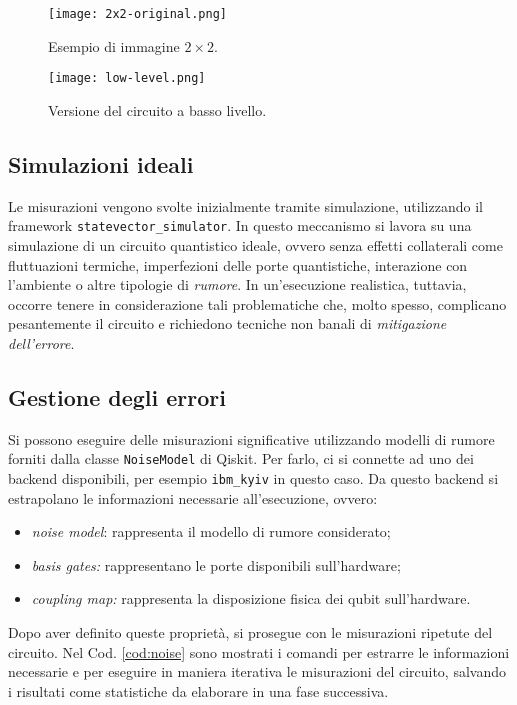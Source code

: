 \begin{figure}[ht]
	\centering
	\texttt{[image: 2x2-original.png]}
	\caption{Esempio di immagine $2\times2$.}\label{fig:2x2-original}
\end{figure}

\begin{figure}[ht]
    \texttt{[image: low-level.png]}
    \caption{Versione del circuito a basso livello.}
		\label{fig:circuito-2x2}
\end{figure}

\subsection{Simulazioni ideali}
Le misurazioni vengono svolte inizialmente tramite simulazione, utilizzando 
il framework \texttt{statevector\_simulator}. In questo meccanismo si lavora su 
una simulazione di un circuito quantistico ideale, ovvero senza effetti collaterali come
fluttuazioni termiche, imperfezioni delle porte quantistiche, interazione con l'ambiente 
o altre tipologie di \textit{rumore}.
In un'esecuzione realistica, tuttavia, occorre tenere in considerazione
tali problematiche che, molto spesso, complicano pesantemente
il circuito e richiedono tecniche non banali di \textit{mitigazione dell'errore}.

\subsection{Gestione degli errori}
Si possono eseguire delle misurazioni significative utilizzando modelli 
di rumore forniti dalla classe \texttt{NoiseModel} di Qiskit. 
Per farlo, ci si connette ad uno dei backend disponibili, per esempio 
\texttt{ibm\_kyiv} in questo caso. Da questo backend si estrapolano le 
informazioni necessarie all'esecuzione, ovvero:
\begin{itemize}
	\item \emph{noise model}: rappresenta il modello di rumore considerato;
    \item \emph{basis gates:} rappresentano le porte disponibili sull'hardware;
    \item \emph{coupling map:} rappresenta la disposizione fisica dei qubit sull'hardware.
\end{itemize}
Dopo aver definito queste proprietà, si prosegue con le misurazioni 
ripetute del circuito. Nel Cod. \ref{cod:noise} sono mostrati 
i comandi per estrarre le informazioni necessarie e per eseguire 
in maniera iterativa le misurazioni del circuito, salvando i risultati 
come statistiche da elaborare in una fase successiva.

